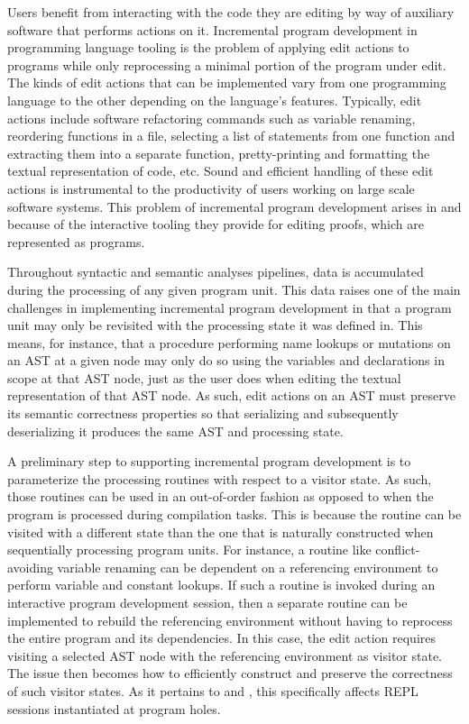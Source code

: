 Users benefit from interacting with the code they are editing by way of auxiliary software that performs actions on it.
Incremental program development in programming language tooling is the problem of applying edit actions to programs while only reprocessing a minimal portion of the program under edit.
The kinds of edit actions that can be implemented vary from one programming language to the other depending on the language's features.
Typically, edit actions include software refactoring commands such as variable renaming, reordering functions in a file, selecting a list of statements from one function and extracting them into a separate function, pretty-printing and formatting the textual representation of code, etc.
Sound and efficient handling of these edit actions is instrumental to the productivity of users working on large scale software systems.
This problem of incremental program development arises in \Beluga and \Harpoon because of the interactive tooling they provide for editing proofs, which are represented as programs.


Throughout syntactic and semantic analyses pipelines, data is accumulated during the processing of any given program unit.
This data raises one of the main challenges in implementing incremental program development in that a program unit may only be revisited with the processing state it was defined in.
This means, for instance, that a procedure performing name lookups or mutations on an \ac{AST} at a given node may only do so using the variables and declarations in scope at that \ac{AST} node, just as the user does when editing the textual representation of that \ac{AST} node.
As such, edit actions on an \ac{AST} must preserve its semantic correctness properties so that serializing and subsequently deserializing it produces the same \ac{AST} and processing state.


A preliminary step to supporting incremental program development is to parameterize the processing routines with respect to a visitor state.
As such, those routines can be used in an out-of-order fashion as opposed to when the program is processed during compilation tasks.
This is because the routine can be visited with a different state than the one that is naturally constructed when sequentially processing program units.
For instance, a routine like conflict-avoiding variable renaming can be dependent on a referencing environment to perform variable and constant lookups.
If such a routine is invoked during an interactive program development session, then a separate routine can be implemented to rebuild the referencing environment without having to reprocess the entire program and its dependencies.
In this case, the edit action requires visiting a selected \ac{AST} node with the referencing environment as visitor state.
The issue then becomes how to efficiently construct and preserve the correctness of such visitor states.
As it pertains to \Beluga and \Harpoon, this specifically affects \ac{REPL} sessions instantiated at program holes.
